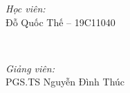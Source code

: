 \begin{titlepage}

\begin{minipage}{0.45\textwidth}
\begin{flushleft} \large
\emph{Học viên:}\\
Đỗ Quốc Thế -- 19C11040 %
\end{flushleft}
\end{minipage}
~
\begin{minipage}{0.5\textwidth}
\begin{flushright} \large
\emph{Giảng viên:} \\
PGS.TS Nguyễn Đình Thúc %
\end{flushright}
\end{minipage}\\[2cm]


\vfill %

\end{titlepage}